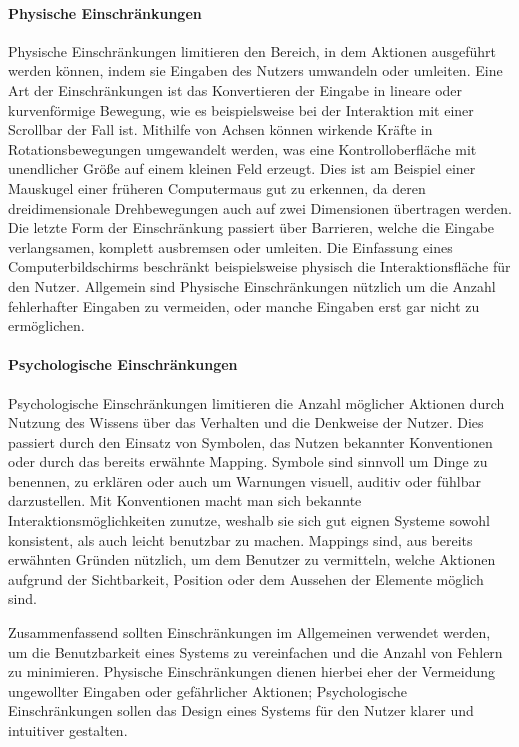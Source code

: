 \paragraph{Physische Einschränkungen}
Physische Einschränkungen limitieren den Bereich, in dem Aktionen ausgeführt werden können, indem sie Eingaben des Nutzers umwandeln oder umleiten.
Eine Art der Einschränkungen ist das Konvertieren der Eingabe in lineare oder kurvenförmige Bewegung, wie es beispielsweise bei der Interaktion mit einer Scrollbar der Fall ist.
Mithilfe von Achsen können wirkende Kräfte in Rotationsbewegungen umgewandelt werden, was eine Kontrolloberfläche mit unendlicher Größe auf einem kleinen Feld erzeugt.
Dies ist am Beispiel einer Mauskugel einer früheren Computermaus gut zu erkennen, da deren dreidimensionale Drehbewegungen auch auf zwei Dimensionen übertragen werden.
Die letzte Form der Einschränkung passiert über Barrieren, welche die Eingabe verlangsamen, komplett ausbremsen oder umleiten. Die Einfassung eines Computerbildschirms beschränkt beispielsweise physisch die Interaktionsfläche für den Nutzer.
Allgemein sind Physische Einschränkungen nützlich um die Anzahl fehlerhafter Eingaben zu vermeiden, oder manche Eingaben erst gar nicht zu ermöglichen\cite{Norman.2016}.

\paragraph{Psychologische Einschränkungen}
Psychologische Einschränkungen limitieren die Anzahl möglicher Aktionen durch Nutzung des Wissens über das Verhalten und die Denkweise der Nutzer.
Dies passiert durch den Einsatz von Symbolen, das Nutzen bekannter Konventionen oder durch das bereits erwähnte Mapping.
Symbole sind sinnvoll um Dinge zu benennen, zu erklären oder auch um Warnungen visuell, auditiv oder fühlbar darzustellen.
Mit Konventionen macht man sich bekannte Interaktionsmöglichkeiten zunutze, weshalb sie sich gut eignen Systeme sowohl konsistent, als auch leicht benutzbar zu machen.
Mappings sind, aus bereits erwähnten Gründen nützlich, um dem Benutzer zu vermitteln, welche Aktionen aufgrund der Sichtbarkeit, Position oder dem Aussehen der Elemente möglich sind\cite{Norman.2016}.

Zusammenfassend sollten Einschränkungen im Allgemeinen verwendet werden, um die Benutzbarkeit eines Systems zu vereinfachen und die Anzahl von Fehlern zu minimieren. Physische Einschränkungen dienen hierbei eher der Vermeidung ungewollter Eingaben oder gefährlicher Aktionen; Psychologische Einschränkungen sollen das Design eines Systems für den Nutzer klarer und intuitiver gestalten.

